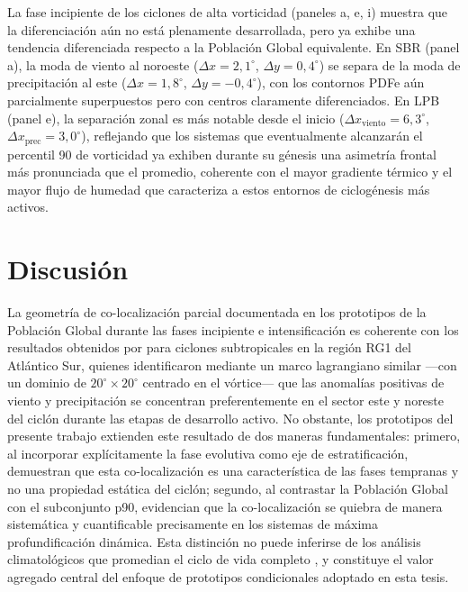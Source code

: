 La fase incipiente de los ciclones de alta vorticidad (paneles a, e, i) muestra que la diferenciación aún no está plenamente desarrollada, pero ya exhibe una tendencia diferenciada respecto a la Población Global equivalente. En SBR (panel a), la moda de viento al noroeste ($\Delta x = 2{,}1^{\circ}$, $\Delta y = 0{,}4^{\circ}$) se separa de la moda de precipitación al este ($\Delta x = 1{,}8^{\circ}$, $\Delta y = -0{,}4^{\circ}$), con los contornos PDFe aún parcialmente superpuestos pero con centros claramente diferenciados. En LPB (panel e), la separación zonal es más notable desde el inicio ($\Delta x_{\text{viento}} = 6{,}3^{\circ}$, $\Delta x_{\text{prec}} = 3{,}0^{\circ}$), reflejando que los sistemas que eventualmente alcanzarán el percentil 90 de vorticidad ya exhiben durante su génesis una asimetría frontal más pronunciada que el promedio, coherente con el mayor gradiente térmico y el mayor flujo de humedad que caracteriza a estos entornos de ciclogénesis más activos.

\section{Discusión}\label{sec:discusion_prototipos}


La geometría de co-localización parcial documentada en los prototipos de la Población Global durante las fases incipiente e intensificación es coherente con los resultados obtenidos por \citet{cardoso2022synoptic} para ciclones subtropicales en la región RG1 del Atlántico Sur, quienes identificaron mediante un marco lagrangiano similar —con un dominio de $20^{\circ} \times 20^{\circ}$ centrado en el vórtice— que las anomalías positivas de viento y precipitación se concentran preferentemente en el sector este y noreste del ciclón durante las etapas de desarrollo activo. No obstante, los prototipos del presente trabajo extienden este resultado de dos maneras fundamentales: primero, al incorporar explícitamente la fase evolutiva como eje de estratificación, demuestran que esta co-localización es una característica de las fases tempranas y no una propiedad estática del ciclón; segundo, al contrastar la Población Global con el subconjunto p90, evidencian que la co-localización se quiebra de manera sistemática y cuantificable precisamente en los sistemas de máxima profundificación dinámica. Esta distinción no puede inferirse de los análisis climatológicos que promedian el ciclo de vida completo \citep{gramcianinov2023impact}, y constituye el valor agregado central del enfoque de prototipos condicionales adoptado en esta tesis.

